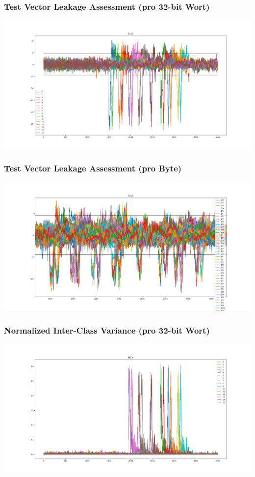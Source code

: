 \documentclass[ngerman]{beamer}
\begin{document}
\begin{frame}

    \frametitle{Test Vector Leakage Assessment (pro 32-bit Wort)}


    \centering
    \includegraphics[width=\linewidth]{img/tvla_specific_overview.png}

\end{frame}



\begin{frame}

    \frametitle{Test Vector Leakage Assessment (pro Byte)}


    \centering
    \includegraphics[width=\linewidth]{img/tvla_specific_bytes.png}

\end{frame}



\begin{frame}

    \frametitle{Normalized Inter-Class Variance (pro 32-bit Wort)}


    \centering
    \includegraphics[width=\linewidth]{img/nicv_overview.png}

\end{frame}
\end{document}

